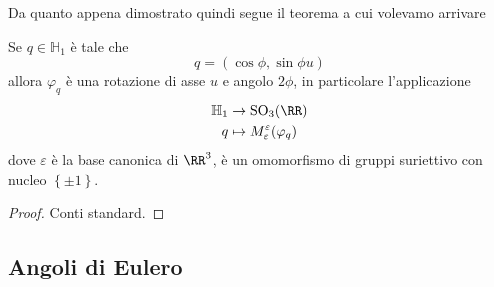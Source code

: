 \documentclass[11pt]{scrartcl}
\newcommand{\SO}{\text{SO}}
\begin{document}
   	 Da quanto appena dimostrato quindi segue il teorema a cui volevamo arrivare
   	 \begin{theorem}
   	 	Se $q\in \mathbb{H}_1$ è tale che
   	 	$$q=\left(\cos\phi,\sin\phi u\right)$$
   	 	allora $\varphi_q$ è una rotazione di asse $u$ e angolo $2\phi$, in particolare l'applicazione
   	 	\begin{align*}
   	 		\mathbb{H}_1 & \to  \SO_3(\RR) \\
   	 		q & \mapsto  M_{\varepsilon}^\varepsilon (\varphi_q)
   	 	\end{align*}
   	 	dove $\varepsilon$ è la base canonica di $\RR^3$, è un omomorfismo di gruppi suriettivo con nucleo $\left\{\pm 1\right\}$.
   	 \end{theorem}
   	 \begin{proof}
   	 	Conti standard.
   	 \end{proof}
   	 \subsection{Angoli di Eulero}
   	 
\end{document}
